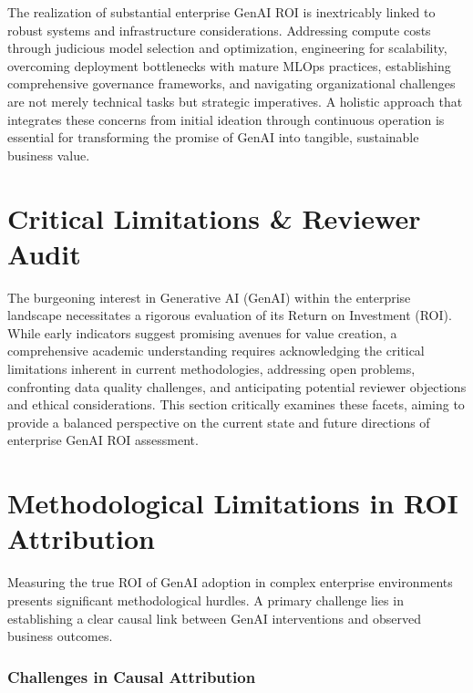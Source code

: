 \documentclass[10pt,twocolumn,letterpaper]{article}
\begin{document}
The realization of substantial enterprise GenAI ROI is inextricably linked to robust systems and infrastructure considerations. Addressing compute costs through judicious model selection and optimization, engineering for scalability, overcoming deployment bottlenecks with mature MLOps practices, establishing comprehensive governance frameworks, and navigating organizational challenges are not merely technical tasks but strategic imperatives. A holistic approach that integrates these concerns from initial ideation through continuous operation is essential for transforming the promise of GenAI into tangible, sustainable business value.

\cite{openalex_w4400993506}




\section{Critical Limitations \& Reviewer Audit}


The burgeoning interest in Generative AI (GenAI) within the enterprise landscape necessitates a rigorous evaluation of its Return on Investment (ROI). While early indicators suggest promising avenues for value creation, a comprehensive academic understanding requires acknowledging the critical limitations inherent in current methodologies, addressing open problems, confronting data quality challenges, and anticipating potential reviewer objections and ethical considerations. This section critically examines these facets, aiming to provide a balanced perspective on the current state and future directions of enterprise GenAI ROI assessment.


\section{Methodological Limitations in ROI Attribution}


Measuring the true ROI of GenAI adoption in complex enterprise environments presents significant methodological hurdles. A primary challenge lies in establishing a clear causal link between GenAI interventions and observed business outcomes.


\subsubsection{Challenges in Causal Attribution}
\end{document}
